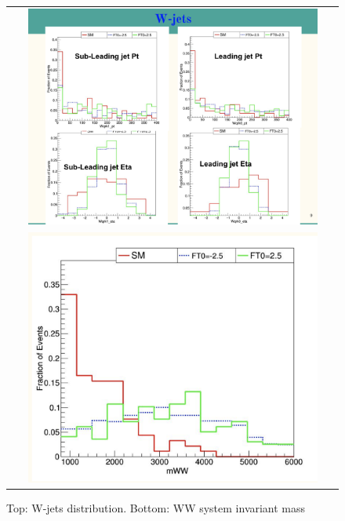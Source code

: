 \begin{figure}[htb]
  \begin{center}
    \begin{tabular}{c}
    \includegraphics[width=0.90\textwidth]{Plots/GenLevelStudy/pic5.png}\\
    \includegraphics[width=0.90\textwidth]{Plots/GenLevelStudy/pic6.png}    \end{tabular}
    \caption{Top: W-jets distribution. Bottom: WW system invariant mass}
    \label{fig:gen3}
  \end{center}
\end{figure}
